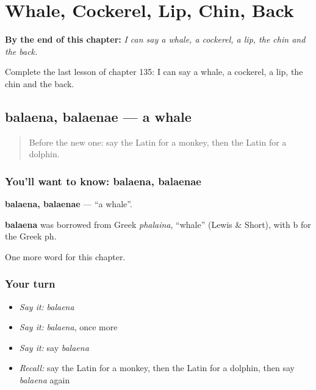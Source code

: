 
\chapter{Whale, Cockerel, Lip, Chin, Back}
\label{ch:la-whale-cockerel-lip-chin-back}

\begin{chapteropening}
\textbf{By the end of this chapter:} \emph{I can say a whale, a cockerel, a lip, the chin and the back.}

Complete the last lesson of chapter 135: I can say a whale, a cockerel, a lip, the chin and the back.
\end{chapteropening}

\section[balaena, balaenae]{balaena, balaenae — a whale}

\label{lesson:LA-C135-balaena}



\begin{quote}
Before the new one: say the Latin for a monkey, then the Latin for a dolphin.
\end{quote}

\subsection*{You'll want to know: balaena, balaenae}
\textbf{balaena, balaenae} — \textquotedblleft{}a whale\textquotedblright{}.

\begin{cousinweb}
\textbf{balaena} was borrowed from Greek \emph{phalaina}, \textquotedblleft{}whale\textquotedblright{} (Lewis \& Short), with b for the Greek ph.
\end{cousinweb}

\begin{grammarlens}[title={What you've built}]
One more word for this chapter.
\end{grammarlens}

\subsection*{Your turn}
\begin{itemize}
\raggedright
  \item \emph{Say it:} \emph{balaena}
  \item \emph{Say it:} \emph{balaena}, once more
  \item \emph{Say it:} say \emph{balaena}
  \item \emph{Recall:} say the Latin for a monkey, then the Latin for a dolphin, then say \emph{balaena} again
\end{itemize}

